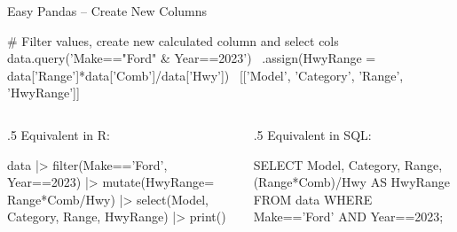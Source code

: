 \documentclass[ignorenonframetext,xcolor=x11names]{beamer}
\begin{document}
\begin{frame}[label=full,fragile]{Easy Pandas -- Create New Columns}

\begin{pythoncode}
# Filter values, create new calculated column and select cols
data.query('Make=="Ford" & Year==2023') \
  .assign(HwyRange = data['Range']*data['Comb']/data['Hwy']) \
  [['Model', 'Category', 'Range', 'HwyRange']]
\end{pythoncode}

\vspace{\baselineskip}

\begin{columns}
\begin{column}{.5\textwidth}
Equivalent in R:
\begin{Rcode}
data |> 
  filter(Make=='Ford', 
         Year==2023) |> 
  mutate(HwyRange=
            Range*Comb/Hwy) |>
  select(Model, Category, 
         Range, HwyRange) |>
  print()
\end{Rcode}
\end{column}
\begin{column}{.5\textwidth}
Equivalent in SQL:

\begin{sqlcode}
SELECT Model, Category, Range, 
  (Range*Comb)/Hwy AS HwyRange 
   FROM data 
   WHERE Make=='Ford' AND 
         Year==2023;
\end{sqlcode}
\end{column}
\end{columns}
\end{frame}
\end{document}
